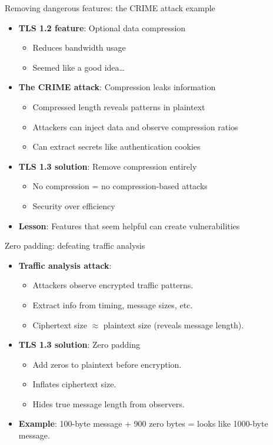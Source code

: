 \ifdefined\PRESENTATION\else\PassOptionsToClass{handout}{beamer}\fi\documentclass[aspectratio=169, lualatex]{beamer}
\begin{document}
\begin{frame}{Removing dangerous features: the CRIME attack example}
	\begin{itemize}
		\item \textbf{TLS 1.2 feature}: Optional data compression
		      \begin{itemize}
			      \item Reduces bandwidth usage
			      \item Seemed like a good idea\ldots
		      \end{itemize}
		\item \textbf{The CRIME attack}: Compression leaks information
		      \begin{itemize}
			      \item Compressed length reveals patterns in plaintext
			      \item Attackers can inject data and observe compression ratios
			      \item Can extract secrets like authentication cookies
		      \end{itemize}
		\item \textbf{TLS 1.3 solution}: Remove compression entirely
		      \begin{itemize}
			      \item No compression = no compression-based attacks
			      \item Security over efficiency
		      \end{itemize}
		\item \textbf{Lesson}: Features that seem helpful can create vulnerabilities
	\end{itemize}
\end{frame}

\begin{frame}{Zero padding: defeating traffic analysis}
	\begin{itemize}
		\item \textbf{Traffic analysis attack}:
		      \begin{itemize}
			      \item Attackers observe encrypted traffic patterns.
			      \item Extract info from timing, message sizes, etc.
			      \item Ciphertext size $\approx$ plaintext size (reveals message length).
		      \end{itemize}
		\item \textbf{TLS 1.3 solution}: Zero padding
		      \begin{itemize}
			      \item Add zeros to plaintext before encryption.
			      \item Inflates ciphertext size.
			      \item Hides true message length from observers.
		      \end{itemize}
		\item \textbf{Example}: 100-byte message + 900 zero bytes = looks like 1000-byte message.
	\end{itemize}
\end{frame}
\end{document}
